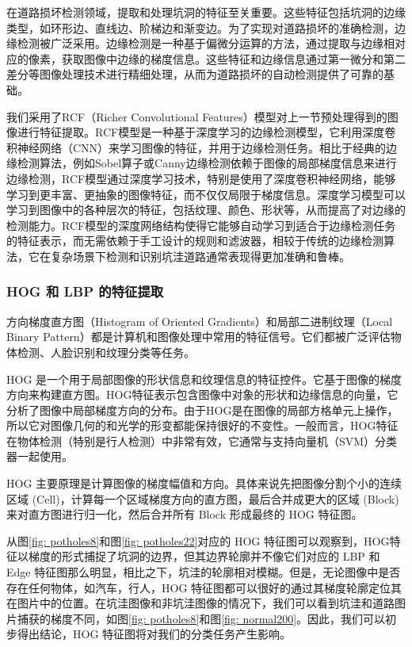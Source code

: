 \documentclass[a4paper, 10pt]{article}
\begin{document}
	在道路损坏检测领域，提取和处理坑洞的特征至关重要。这些特征包括坑洞的边缘类型，如环形边、直线边、阶梯边和渐变边。为了实现对道路损坏的准确检测，边缘检测被广泛采用。边缘检测是一种基于偏微分运算的方法，通过提取与边缘相对应的像素，获取图像中边缘的梯度信息。这些特征和边缘信息通过第一微分和第二差分等图像处理技术进行精细处理，从而为道路损坏的自动检测提供了可靠的基础。
	
	我们采用了RCF（Richer Convolutional Features）模型对上一节预处理得到的图像进行特征提取。RCF模型是一种基于深度学习的边缘检测模型，它利用深度卷积神经网络（CNN）来学习图像的特征，并用于边缘检测任务\cite{8516362}。相比于经典的边缘检测算法，例如Sobel算子或Canny边缘检测依赖于图像的局部梯度信息来进行边缘检测，RCF模型通过深度学习技术，特别是使用了深度卷积神经网络，能够学习到更丰富、更抽象的图像特征，而不仅仅局限于梯度信息。深度学习模型可以学习到图像中的各种层次的特征，包括纹理、颜色、形状等，从而提高了对边缘的检测能力\cite{rs10091496}。RCF模型的深度网络结构使得它能够自动学习到适合于边缘检测任务的特征表示，而无需依赖于手工设计的规则和滤波器，相较于传统的边缘检测算法，它在复杂场景下检测和识别坑洼道路通常表现得更加准确和鲁棒。
	
	\subsubsection{HOG 和 LBP 的特征提取}
	
	方向梯度直方图（Histogram of Oriented Gradients）和局部二进制纹理（Local Binary Pattern）都是计算机和图像处理中常用的特征信号。它们都被广泛评估物体检测、人脸识别和纹理分类等任务。
	
	HOG 是一个用于局部图像的形状信息和纹理信息的特征控件。它基于图像的梯度方向来构建直方图。HOG特征表示包含图像中对象的形状和边缘信息的向量，它分析了图像中局部梯度方向的分布。由于HOG是在图像的局部方格单元上操作，所以它对图像几何的和光学的形变都能保持很好的不变性。一般而言，HOG特征在物体检测（特别是行人检测）中非常有效，它通常与支持向量机（SVM）分类器一起使用。
	
	HOG 主要原理是计算图像的梯度幅值和方向。具体来说先把图像分割个小的连续区域 (Cell)，计算每一个区域梯度方向的直方图，最后合并成更大的区域 (Block) 来对直方图进行归一化，然后合并所有 Block 形成最终的 HOG 特征图。
	
	从图\ref{fig: potholes8}和图\ref{fig: potholes22}对应的 HOG 特征图可以观察到，HOG特征以梯度的形式捕捉了坑洞的边界，但其边界轮廓并不像它们对应的 LBP 和 Edge 特征图那么明显，相比之下，坑洼的轮廓相对模糊。但是，无论图像中是否存在任何物体，如汽车，行人，HOG 特征图都可以很好的通过其梯度轮廓定位其在图片中的位置。在坑洼图像和非坑洼图像的情况下，我们可以看到坑洼和道路图片捕获的梯度不同，如图\ref{fig: potholes8}和图\ref{fig: normal200}。因此，我们可以初步得出结论，HOG 特征图将对我们的分类任务产生影响。
	
\end{document}
